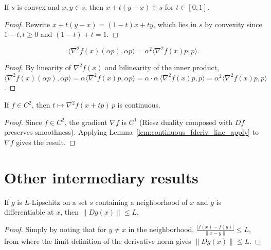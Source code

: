 \begin{lemma}\label{lem:Convex.add_smul_sub_mem_unit}
  \leanok{}
  \uses{}
  If $s$ is convex and $x,y\in s$, then $x+t(y-x)\in s$ for $t\in[0,1]$.
\end{lemma}
\begin{proof}
  \leanok{}
  Rewrite $x+t(y-x) = (1-t)x + ty$, which lies in $s$ by convexity since $1-t,t\ge 0$ and $(1-t)+t=1$.
\end{proof}

\begin{lemma}\label{lem:hessian_inner_smul}
  \leanok{}
  \[
    \langle \nabla^2 f(x)(\alpha p),\alpha p\rangle = \alpha^2\langle \nabla^2 f(x)p,p\rangle.
  \]
\end{lemma}
\begin{proof}
  \leanok{}
  By linearity of $\nabla^2 f(x)$ and bilinearity of the inner product,
  $\langle \nabla^2 f(x)(\alpha p), \alpha p\rangle = \alpha\langle\nabla^2 f(x)p, \alpha p\rangle
  = \alpha\cdot\alpha\,\langle\nabla^2 f(x)p,p\rangle = \alpha^2\langle \nabla^2 f(x)p,p\rangle$.
\end{proof}

\begin{lemma}\label{lem:continuous_hessian_line}
  \leanok{}
  If $f\in C^2$, then $t\mapsto \nabla^2 f(x+t p)\,p$ is continuous.
\end{lemma}
\begin{proof}
  \leanok{}
  Since $f\in C^2$, the gradient $\nabla f$ is $C^1$ (Riesz duality composed with $Df$ preserves
  smoothness). Applying Lemma~\ref{lem:continuous_fderiv_line_apply} to $\nabla f$ gives the result.
\end{proof}

\section{Other intermediary results}
\begin{lemma}\label{lem:opNorm_fderiv_le_of_lipschitz}
  \leanok{}
  \uses{}
  If $g$ is $L$-Lipschitz on a set $s$ containing a neighborhood of $x$ and $g$ is differentiable at $x$,
  then $\|Dg(x)\|\le L$.
\end{lemma}
\begin{proof}
  \leanok{}
  Simply by noting that for $y\neq x$ in the neighborhood, $\frac{|f(x)-f(y)|}{\|x-y\|} \leq L$,
  from where the limit definition of the derivative norm gives $\|Dg(x)\|\le L$.
\end{proof}

